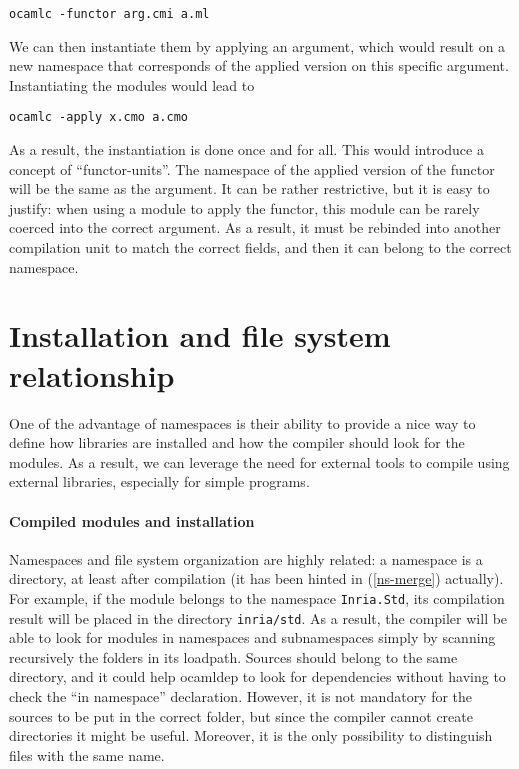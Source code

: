 \begin{verbatim}
ocamlc -functor arg.cmi a.ml
\end{verbatim}

We can then instantiate them by applying an argument, which would result on
a new namespace that corresponds of the applied version on this specific
argument. Instantiating the modules would lead to 

\begin{verbatim}
ocamlc -apply x.cmo a.cmo 
\end{verbatim}

As a result, the instantiation is done once and for all. This would introduce a
concept of ``functor-units''. The namespace of the applied version of the
functor will be the same as the argument. It can be rather restrictive, but it
is easy to justify: when using a module to apply the functor, this module can be
rarely coerced into the correct argument. As a result, it must be rebinded into
another compilation unit to match the correct fields, and then it can belong to
the correct namespace.

\section{Installation and file system relationship}

One of the advantage of namespaces is their ability to provide a nice way to
define how libraries are installed and how the compiler should look for the
modules. As a result, we can leverage the need for external tools to compile
using external libraries, especially for simple programs.

\paragraph{Compiled modules and installation}

Namespaces and file system organization are highly related: a namespace is a
directory, at least after compilation (it has been hinted in (\ref{ns-merge})
actually). For example, if the module belongs to the namespace
\texttt{Inria.Std}, its compilation result will be placed in the directory
\texttt{inria/std}. As a result, the compiler will be able to look for modules
in namespaces and subnamespaces simply by scanning recursively the folders in
its loadpath. Sources should belong to the same directory, and it could help
ocamldep to look for dependencies without having to check the ``in namespace''
declaration. However, it is not mandatory for the sources to be put in the
correct folder, but since the compiler cannot create directories it might be
useful. Moreover, it is the only possibility to distinguish files with the same
name.

